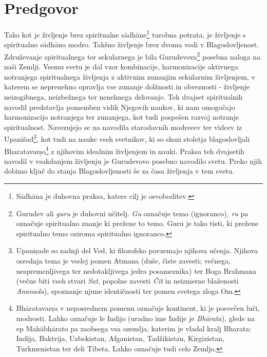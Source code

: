 \section*{Predgovor}
Tako kot je življenje brez spiritualne s\={a}dh\={a}ne\footnote{S\={a}dh\={a}na je duhovna praksa, katere cilj je osvoboditev.} turobna potrata, je življenje s spiritualno s\={a}dh\={a}no modro. Takšno življenje brez dvoma vodi v Blagoslovljenost.
Združevanje spiritualnega ter sekularnega je bila Gurudevova\footnote{Gurudev ali \emph{guru} je duhovni učitelj. \emph{Gu} označuje temo (ignoranco), \emph{ru} pa označuje spiritualno znanje ki prežene to temo. Guru je tako tisti, ki prežene spiritualno temo oziroma spiritualno ignoranco.} posebna naloga na naši Zemlji.
Vsemu svetu je dal vzor kombinacije, harmonizacije aktivnega notranjega spiritualnega življenja z aktivnim zunanjim sekularnim življenjem, v katerem se neprenehno opravlja vse zunanje dolžnosti in obveznosti - življenje neizogibnega, neizbežnega ter nenehnega delovanje. Teh dvajset spiritualnih navodil predstavlja pomemben vidik Njegovih naukov, ki nam omogočajo harmonizacijo notranjega ter zunanjega, kot tudi pospešen razvoj notranje spiritualnost. Navezujejo se na navodila starodavnih modrecev ter vidcev iz Upanišad\footnote{Upani\d{s}ade so zadnji del Ved, ki filozofsko povzemajo njihova učenja. Njihova osrednja tema je vselej pomen Atmana (duše, čiste zavesti; večnega, nespremenljivega ter nedotakljivega jedra posameznika) ter Boga Brahmana (večne biti vseh stvari \emph{Sat}, popolne zavesti \emph{Čit} in neizmerne blaženosti \emph{Ananada}), spoznanje njune identičnosti ter pomen svetega zloga Om.}, kot tudi na nauke vseh svetnikov, ki so skozi stoletja blagoslovljali Bharatavar\d{s}o\footnote{Bh\={a}ratavar\d{s}a v neposrednem pomenu označuje kontinent, ki je posvečen luči, modrosti. Lahko označuje le Indijo (uradno ime Indije je \emph{Bh\={a}rata}), glede na ep Mah\={a}bh\={a}rato pa zaobsega vsa ozemlja, katerim je vladal kralj Bharata: Indija, Baktrija, Uzbekistan, Afganistan, Tadžikistan,  Kirgizistan, Turkmenistan ter deli Tibeta. Lahko označuje tudi celo Zemljo.} z njihovim idealnim življenjem in nauki.
Praksa teh dvajsetih navodil v vsakdanjem življenju je Gurudevovo posebno navodilo svetu. Preko njih dobimo ključ do stanja Blagoslovljenosti še za časa življenja v tem svetu.
